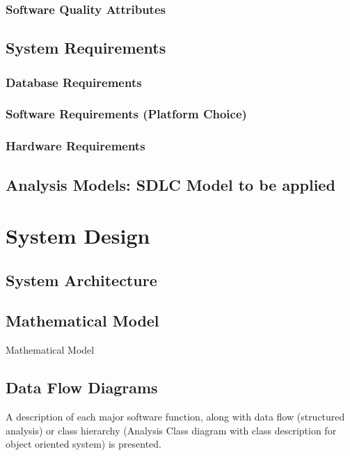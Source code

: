 \documentclass[oneside,a4paper,12pt]{book}
\begin{document}
    \subsection{Software Quality Attributes}
  


\section{System Requirements}
\subsection{Database Requirements}
\subsection{Software Requirements (Platform Choice)}
\subsection{Hardware Requirements}

\section{Analysis Models: SDLC Model to be applied}



\newpage


\chapter{System Design}

\section{System Architecture}



\section{Mathematical Model}
Mathematical Model

\section{Data Flow Diagrams}

A description of each major software function, along with data flow (structured analysis) or class hierarchy (Analysis Class diagram with class description for object oriented system) is presented. 
\end{document}
